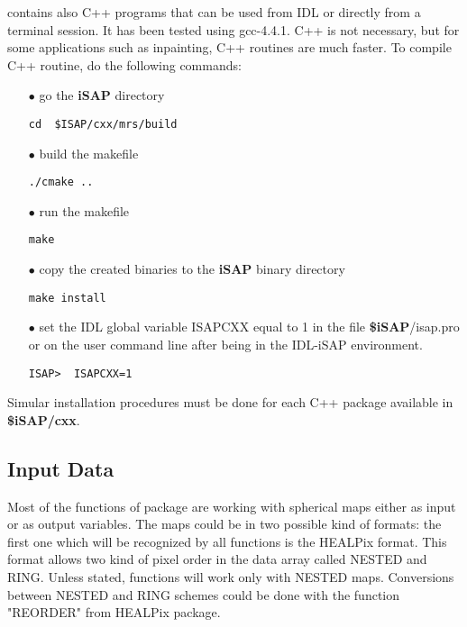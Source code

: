  \projmrs  contains also C++ programs that can be used from IDL or directly from a terminal session. It has been tested using gcc-4.4.1. C++ is not necessary, but for some applications
 such as inpainting, C++ routines are much faster. To compile C++ routine, do the following commands:
\begin{itemize}
\item[$\bullet$] {go the \textbf{iSAP} directory }  
\begin{verbatim}
cd  $ISAP/cxx/mrs/build
\end{verbatim} 
 \item[$\bullet$]{build the makefile}  
\begin{verbatim}
./cmake .. 
\end{verbatim}
\item[$\bullet$]{run the makefile}  
\begin{verbatim}
make
\end{verbatim}
\item[$\bullet$]{copy the created binaries to the \textbf{iSAP} binary directory}
\begin{verbatim}
make install
\end{verbatim}
\item[$\bullet$]{set the IDL global variable ISAPCXX equal to 1 in the file  \textbf{\$iSAP}/isap.pro or on the user command line after being in the IDL-iSAP environment. }
\begin{verbatim}
ISAP>  ISAPCXX=1
\end{verbatim}
\end{itemize}

 Simular installation procedures must be done for each C++ package available in  \textbf{\$iSAP/cxx}.
 
\subsection{Input Data}
Most of the functions of \mrs package are working with spherical maps either as input or as output variables. The maps could be in 
two possible kind of formats: the first one which will be recognized by all functions is the HEALPix format. This format allows 
two kind of pixel order in the data array called NESTED and RING. Unless stated, \mrs functions will work only with NESTED maps. 
Conversions between NESTED and RING schemes could be done with the function "REORDER" from HEALPix package. 

